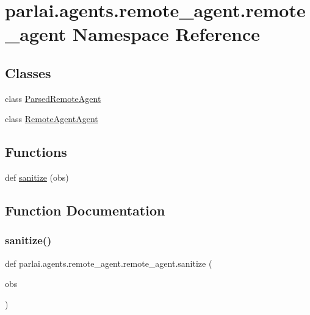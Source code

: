 \hypertarget{namespaceparlai_1_1agents_1_1remote__agent_1_1remote__agent}{}\section{parlai.\+agents.\+remote\+\_\+agent.\+remote\+\_\+agent Namespace Reference}
\label{namespaceparlai_1_1agents_1_1remote__agent_1_1remote__agent}
\subsection*{Classes}
\begin{DoxyCompactItemize}
\item 
class \hyperlink{classparlai_1_1agents_1_1remote__agent_1_1remote__agent_1_1ParsedRemoteAgent}{Parsed\+Remote\+Agent}
\item 
class \hyperlink{classparlai_1_1agents_1_1remote__agent_1_1remote__agent_1_1RemoteAgentAgent}{Remote\+Agent\+Agent}
\end{DoxyCompactItemize}
\subsection*{Functions}
\begin{DoxyCompactItemize}
\item 
def \hyperlink{namespaceparlai_1_1agents_1_1remote__agent_1_1remote__agent_a89751a1e0abc561f94b94db63d8ee2c4}{sanitize} (obs)
\end{DoxyCompactItemize}


\subsection{Function Documentation}
\mbox{\label{namespaceparlai_1_1agents_1_1remote__agent_1_1remote__agent_a89751a1e0abc561f94b94db63d8ee2c4}} 
\subsubsection{\texorpdfstring{sanitize()}{sanitize()}}
{\footnotesize\ttfamily def parlai.\+agents.\+remote\+\_\+agent.\+remote\+\_\+agent.\+sanitize (\begin{DoxyParamCaption}\item[{}]{obs }\end{DoxyParamCaption})}

